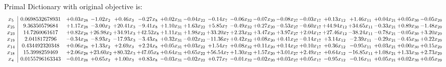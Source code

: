 \documentclass[9pt]{article}
\begin{document}
Primal Dictionary with original objective is:
\[\begin{array}{c| c c@{\hskip 2pt} c@{\hskip 2pt} c@{\hskip 2pt} c@{\hskip 2pt} c@{\hskip 2pt} c@{\hskip 2pt} c@{\hskip 2pt} c@{\hskip 2pt} c@{\hskip 2pt} c@{\hskip 2pt} c@{\hskip 2pt} c@{\hskip 2pt} c@{\hskip 2pt} c@{\hskip 2pt} c@{\hskip 2pt} c@{\hskip 2pt} }
 x_{5}   &  0.0698532678931 & +  0.03 x_{28} & -1.02 x_{2} & +  0.46 x_{3} & -0.27 x_{8} & +  0.02 x_{31} & -0.04 x_{22} & -0.14 x_{7} & -0.06 x_{32} & -0.07 x_{20} & -0.08 x_{27} & -0.03 x_{17} & +  0.13 x_{12} & +  1.46 x_{11} & +  0.04 x_{21} & +  0.05 x_{30} & -0.05 x_{29}\\
 x_{25}   &  9.36350579684 & +  1.17 x_{28} & -3.00 x_{2} & + 20.41 x_{3} & -9.41 x_{8} & +  1.10 x_{31} & +  1.63 x_{22} & +  5.85 x_{7} & -0.49 x_{32} & +  0.27 x_{20} & -0.53 x_{27} & -0.60 x_{17} & + 44.94 x_{12} & + 34.65 x_{11} & -0.33 x_{21} & +  0.89 x_{30} & -1.48 x_{29}\\
 x_{23}   &  14.7260061617 & +  0.82 x_{28} & + 26.98 x_{2} & + 34.91 x_{3} & + 42.52 x_{8} & +  1.11 x_{31} & +  1.98 x_{22} & + 33.20 x_{7} & +  2.23 x_{32} & +  3.47 x_{20} & +  3.97 x_{27} & +  2.04 x_{17} & + 27.46 x_{12} & -38.24 x_{11} & -0.78 x_{21} & -0.05 x_{30} & +  3.20 x_{29}\\
 x_{19}   &  2.0418172796 & -0.34 x_{28} & -8.93 x_{2} & -17.93 x_{3} & -3.43 x_{8} & +  0.32 x_{31} & -0.02 x_{22} & -11.36 x_{7} & +  0.42 x_{32} & +  0.08 x_{20} & +  0.41 x_{27} & -0.14 x_{17} & +  3.14 x_{12} & -2.39 x_{11} & -0.29 x_{21} & -0.45 x_{30} & +  0.22 x_{29}\\
 x_{14}   &  0.434492320348 & +  0.06 x_{28} & +  1.33 x_{2} & +  2.69 x_{3} & +  2.24 x_{8} & +  0.05 x_{31} & +  0.03 x_{22} & +  1.54 x_{7} & +  0.08 x_{32} & +  0.11 x_{20} & +  0.14 x_{27} & +  0.10 x_{17} & +  0.36 x_{12} & -0.95 x_{11} & +  0.03 x_{21} & +  0.00 x_{30} & +  0.15 x_{29}\\
 x_{18}   &  15.3998259469 & +  2.06 x_{28} & + 23.60 x_{2} & + 80.32 x_{3} & + 47.05 x_{8} & +  0.64 x_{31} & +  0.65 x_{22} & + 56.54 x_{7} & +  1.30 x_{32} & +  1.57 x_{20} & +  3.01 x_{27} & +  2.49 x_{17} & +  0.64 x_{12} & -16.85 x_{11} & +  1.08 x_{21} & +  1.33 x_{30} & +  2.73 x_{29}\\
 x_{4}   &  0.0155796163343 & -0.01 x_{28} & +  0.65 x_{2} & +  1.00 x_{3} & +  0.83 x_{8} & -0.03 x_{31} & -0.02 x_{22} & +  0.77 x_{7} & -0.01 x_{32} & -0.02 x_{20} & +  0.03 x_{27} & +  0.05 x_{17} & -0.95 x_{12} & -0.16 x_{11} & +  0.05 x_{21} & +  0.02 x_{30} & +  0.05 x_{29}\\

\end{array}\]
\end{document}

